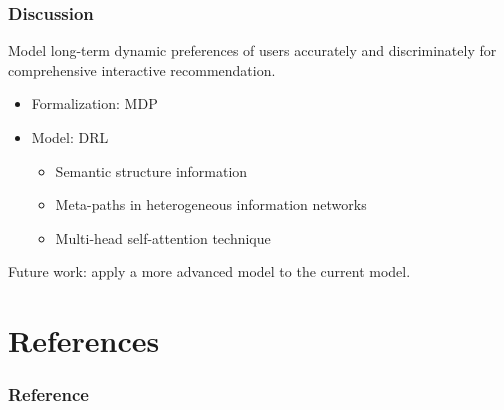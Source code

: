\documentclass{../presentation}
\begin{document}
    \begin{frame}
        \frametitle{Discussion}

        Model long-term dynamic preferences of users accurately and discriminately for comprehensive interactive recommendation.

        \begin{itemize}
            \item Formalization: MDP
            \item Model: DRL
            \begin{itemize}
                \item Semantic structure information
                \item Meta-paths in heterogeneous information networks
                \item Multi-head self-attention technique
            \end{itemize}
        \end{itemize}

        Future work: apply a more advanced model to the current model.

    \end{frame}

    \section{References}
    \begin{frame}[allowframebreaks]
        \frametitle{Reference}
        \footnotesize
        
        
    \end{frame}
\end{document}
